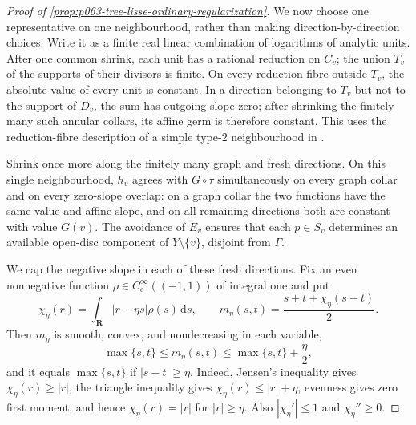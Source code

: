 \begin{proof}[Proof of
\cref{prop:p063-tree-lisse-ordinary-regularization}]
We now choose one representative on one neighbourhood, rather than making
direction-by-direction choices.  Write it as a finite real linear
combination of logarithms of analytic units.  After one common shrink, each
unit has a rational reduction on \(C_v\); the union \(T_v\) of the supports
of their divisors is finite.  On every reduction fibre outside \(T_v\),
the absolute value of every unit is constant.  In a direction belonging to
\(T_v\) but not to the support of \(D_v\), the sum has outgoing slope zero;
after shrinking the finitely many such annular collars, its affine germ is
therefore constant.  This uses the reduction-fibre description of a simple
type-\(2\) neighbourhood in
\cite[\S4.29 and Lemma~5.12(3)]{BPR13Structure}.

Shrink once more along the finitely many graph and fresh directions.  On
this single neighbourhood, \(h_v\) agrees with \(G\circ\tau\)
simultaneously on every graph collar and on every zero-slope overlap: on a
graph collar the two functions have the same value and affine slope, and on
all remaining directions both are constant with value \(G(v)\).  The
avoidance of \(E_v\) ensures that each \(p\in S_v\)
determines an available open-disc component of \(Y\setminus\{v\}\),
disjoint from \(\Gamma\).

We cap the negative slope in each of these fresh directions.  Fix an even
nonnegative function \(\rho\in C^\infty_c((-1,1))\) of integral one and
put
\[
 \chi_\eta(r)=\int_{\mathbf R}|r-\eta s|\rho(s)\,\mathrm ds,
 \qquad
 m_\eta(s,t)=\frac{s+t+\chi_\eta(s-t)}2.
\]
Then \(m_\eta\) is smooth, convex, and nondecreasing in each variable,
\begin{equation}
\label{eq:p063-regularized-max-bounds}
 \max\{s,t\}\leq m_\eta(s,t)
       \leq\max\{s,t\}+\frac{\eta}{2},
\end{equation}
and it equals \(\max\{s,t\}\) if \(|s-t|\geq\eta\).  Indeed, Jensen's
inequality gives \(\chi_\eta(r)\geq|r|\), the triangle inequality gives
\(\chi_\eta(r)\leq|r|+\eta\), evenness gives zero first moment, and hence
\(\chi_\eta(r)=|r|\) for \(|r|\geq\eta\).  Also
\(|\chi_\eta'|\leq1\) and \(\chi_\eta''\geq0\).


\end{proof}
